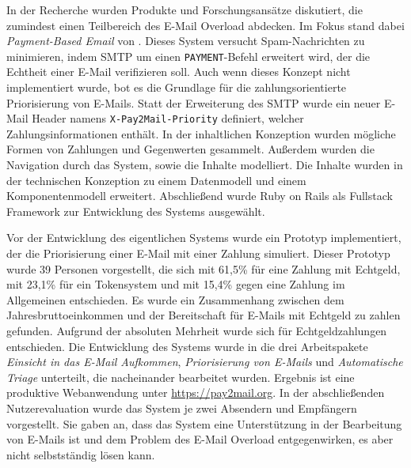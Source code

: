 In der Recherche wurden Produkte und Forschungsansätze diskutiert, die zumindest einen Teilbereich des E-Mail Overload abdecken. Im Fokus stand dabei \textit{Payment-Based Email} von \cite{Turner2003}. Dieses System versucht Spam-Nachrichten zu minimieren, indem SMTP um einen \texttt{PAYMENT}-Befehl erweitert wird, der die Echtheit einer E-Mail verifizieren soll. Auch wenn dieses Konzept nicht implementiert wurde, bot es die Grundlage für die zahlungsorientierte Priorisierung von E-Mails. Statt der Erweiterung des SMTP wurde ein neuer E-Mail Header namens \texttt{X-Pay2Mail-Priority} definiert, welcher Zahlungsinformationen enthält. In der inhaltlichen Konzeption wurden mögliche Formen von Zahlungen und Gegenwerten gesammelt. Außerdem wurden die Navigation durch das System, sowie die Inhalte modelliert. Die Inhalte wurden in der technischen Konzeption zu einem Datenmodell und einem Komponentenmodell erweitert. Abschließend wurde Ruby on Rails als Fullstack Framework zur Entwicklung des Systems ausgewählt.

Vor der Entwicklung des eigentlichen Systems wurde ein Prototyp implementiert, der die Priorisierung einer E-Mail mit einer Zahlung simuliert. Dieser Prototyp wurde 39 Personen vorgestellt, die sich mit 61,5\% für eine Zahlung mit Echtgeld, mit 23,1\% für ein Tokensystem und mit 15,4\% gegen eine Zahlung im Allgemeinen entschieden. Es wurde ein Zusammenhang zwischen dem Jahresbruttoeinkommen und der Bereitschaft für E-Mails mit Echtgeld zu zahlen gefunden. Aufgrund der absoluten Mehrheit wurde sich für Echtgeldzahlungen entschieden. Die Entwicklung des Systems wurde in die drei Arbeitspakete \textit{Einsicht in das E-Mail Aufkommen}, \textit{Priorisierung von E-Mails} und \textit{Automatische Triage} unterteilt, die nacheinander bearbeitet wurden. Ergebnis ist eine produktive Webanwendung unter \url{https://pay2mail.org}. In der abschließenden Nutzerevaluation wurde das System je zwei Absendern und Empfängern vorgestellt. Sie gaben an, dass das System eine Unterstützung in der Bearbeitung von E-Mails ist und dem Problem des E-Mail Overload entgegenwirken, es aber nicht selbstständig lösen kann.

